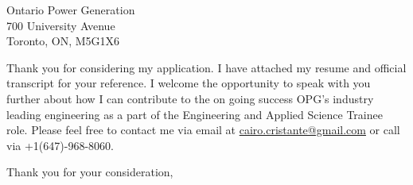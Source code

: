 \documentclass[11pt]{FDUletter}
\begin{document}
\begin{letter}{
    Ontario Power Generation \\
    700 University Avenue\\
    Toronto, ON, M5G1X6 \\
}




Thank you for considering my application. I have attached my resume and official transcript for your reference. I welcome the opportunity to speak with you further about how I can contribute to the on going success OPG's industry leading engineering as a part of the Engineering and Applied Science Trainee role. Please feel free to contact me via email at \href{mailto:cairo.cristante@gmail.com}{cairo.cristante@gmail.com} or call via +1(647)-968-8060.


\closing{Thank you for your consideration,}




% 
% 

\end{letter}
\end{document}
